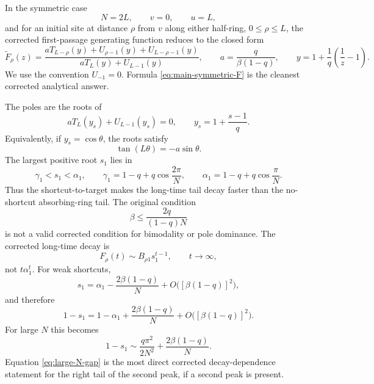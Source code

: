 \documentclass[11pt]{article}
\newcommand{\wt}{\widetilde}
\begin{document}
In the symmetric case
\begin{equation}
  N=2L,
  \qquad v=0,
  \qquad u=L,
\end{equation}
and for an initial site at distance $\rho$ from $v$ along either half-ring,
$0\leq\rho\leq L$, the corrected first-passage generating function reduces to the closed form
\begin{equation}
  \boxed{
  \wt F_{\rho}(z)=
  \frac{aT_{L-\rho}(y)+U_{\rho-1}(y)+U_{L-\rho-1}(y)}
  {aT_L(y)+U_{L-1}(y)},
  \qquad
  a=\frac{q}{\beta(1-q)},
  \qquad
  y=1+\frac{1}{q}\left(\frac1z-1\right).}
  \label{eq:main-symmetric-F}
\end{equation}
We use the convention $U_{-1}=0$.  Formula \eqref{eq:main-symmetric-F} is the cleanest corrected
analytical answer.

The poles are the roots of
\begin{equation}
  \boxed{aT_L(y_s)+U_{L-1}(y_s)=0,
  \qquad y_s=1+\frac{s-1}{q}.}
  \label{eq:main-pole-equation-y}
\end{equation}
Equivalently, if $y_s=\cos\theta$, the roots satisfy
\begin{equation}
  \boxed{\tan(L\theta)=-a\sin\theta.}
  \label{eq:main-pole-equation-theta}
\end{equation}
The largest positive root $s_1$ lies in
\begin{equation}
  \boxed{\gamma_1<s_1<\alpha_1,}
  \qquad
  \gamma_1=1-q+q\cos\frac{2\pi}{N},
  \qquad
  \alpha_1=1-q+q\cos\frac{\pi}{N}.
  \label{eq:s1-between}
\end{equation}
Thus the shortcut-to-target makes the long-time tail decay faster than the no-shortcut
absorbing-ring tail.  The original condition
\begin{equation}
  \beta\leq \frac{2q}{(1-q)N}
\end{equation}
is not a valid corrected condition for bimodality or pole dominance.  The corrected long-time
decay is
\begin{equation}
  \boxed{F_\rho(t)\sim B_{\rho 1}s_1^{t-1},
  \qquad t\to\infty,}
  \label{eq:main-tail}
\end{equation}
not $t\alpha_1^t$.  For weak shortcuts,
\begin{equation}
  \boxed{
  s_1=\alpha_1-\frac{2\beta(1-q)}{N}+O\bigl([\beta(1-q)]^2\bigr),}
  \label{eq:weak-shortcut-s1}
\end{equation}
and therefore
\begin{equation}
  \boxed{
  1-s_1=1-\alpha_1+\frac{2\beta(1-q)}{N}+O\bigl([\beta(1-q)]^2\bigr).}
  \label{eq:weak-shortcut-gap}
\end{equation}
For large $N$ this becomes
\begin{equation}
  \boxed{
  1-s_1\sim \frac{q\pi^2}{2N^2}+\frac{2\beta(1-q)}{N}.}
  \label{eq:large-N-gap}
\end{equation}
Equation \eqref{eq:large-N-gap} is the most direct corrected decay-dependence statement for the
right tail of the second peak, if a second peak is present.
\end{document}
